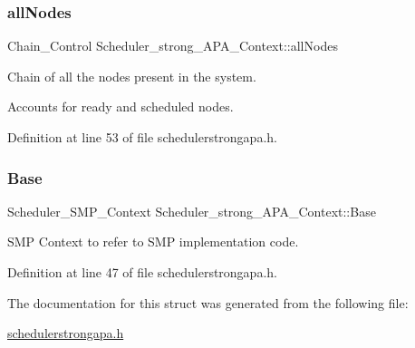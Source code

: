 \subsubsection{\texorpdfstring{all\+Nodes}{allNodes}}
{\footnotesize\ttfamily Chain\+\_\+\+Control Scheduler\+\_\+strong\+\_\+\+A\+P\+A\+\_\+\+Context\+::all\+Nodes}



Chain of all the nodes present in the system. 

Accounts for ready and scheduled nodes. 

Definition at line 53 of file schedulerstrongapa.\+h.

\mbox{\label{structScheduler__strong__APA__Context_a55755b445b7e7beaf1b87b178521e615}} 
\subsubsection{\texorpdfstring{Base}{Base}}
{\footnotesize\ttfamily Scheduler\+\_\+\+S\+M\+P\+\_\+\+Context Scheduler\+\_\+strong\+\_\+\+A\+P\+A\+\_\+\+Context\+::\+Base}



S\+MP Context to refer to S\+MP implementation code. 



Definition at line 47 of file schedulerstrongapa.\+h.



The documentation for this struct was generated from the following file\+:\begin{DoxyCompactItemize}
\item 
\hyperlink{schedulerstrongapa_8h}{schedulerstrongapa.\+h}\end{DoxyCompactItemize}
